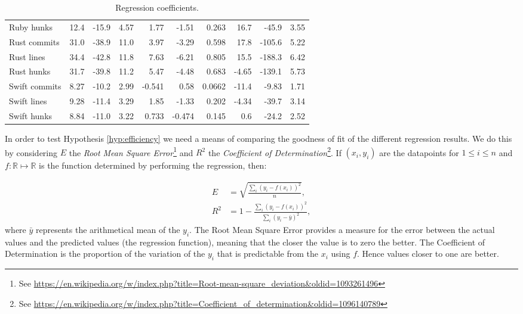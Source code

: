 \documentclass[10pt,journal,compsoc]{IEEEtran}
\begin{document}
\begin{table*}[t!]
\begin{center}
\begin{tabular}{l | *{3}{d{3.4}} | *{3}{d{3.4}} | d{4.5} *{2}{d{3.4}} }
Ruby hunks & 12.4 & -15.9 & 4.57 & 1.77 & -1.51 & 0.263 & 16.7 & -45.9 & 3.55 \\ \hdashline
Rust commits & 31.0 & -38.9 & 11.0 & 3.97 & -3.29 & 0.598 & 17.8 & -105.6 & 5.22 \\
Rust lines & 34.4 & -42.8 & 11.8 & 7.63 & -6.21 & 0.805 & 15.5 & -188.3 & 6.42 \\
Rust hunks & 31.7 & -39.8 & 11.2 & 5.47 & -4.48 & 0.683 & -4.65 & -139.1 & 5.73 \\ \hdashline
Swift commits & 8.27 & -10.2 & 2.99 & -0.541 & 0.58 & 0.0662 & -11.4 & -9.83 & 1.71 \\
Swift lines & 9.28 & -11.4 & 3.29 & 1.85 & -1.33 & 0.202 & -4.34 & -39.7 & 3.14 \\
Swift hunks & 8.84 & -11.0 & 3.22 & 0.733 & -0.474 & 0.145 & 0.6 & -24.2 & 2.52
\end{tabular}
\caption{\label{table:coefficients}Regression coefficients.}
\end{center}
\end{table*}

In order to test Hypothesis \ref{hyp:efficiency} we need a means of comparing the goodness of fit of the different regression results. We do this by considering $E$ the {\it Root Mean Square Error\/}\footnote{See \url{https://en.wikipedia.org/w/index.php?title=Root-mean-square_deviation&oldid=1093261496}} and $R^2$ the {\it Coefficient of Determination\/}\footnote{See \url{https://en.wikipedia.org/w/index.php?title=Coefficient_of_determination&oldid=1096140789}}. If $(x_i, y_i)$ are the datapoints for $1 \le i \le n$ and $f : \mathbb{R} \mapsto \mathbb{R}$ is the function determined by performing the regression, then:

\begin{align}
E   & = \sqrt{\frac{\sum_i (y_i - f(x_i))^2}{n}}, \\
R^2 & = 1 - \frac{\sum_i (y_i - f(x_i))^2}{\sum_i (y_i - \bar{y})^2},
\end{align}
where $\bar{y}$ represents the arithmetical mean of the $y_i$. The Root Mean Square Error provides a measure for the error between the actual values and the predicted values (the regression function), meaning that the closer the value is to zero the better. The Coefficient of Determination is the proportion of the variation of the $y_i$ that is predictable from the $x_i$ using $f$. Hence values closer to one are better.
\end{document}
